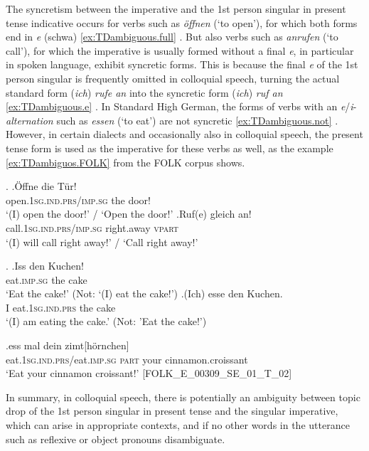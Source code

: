 The syncretism between the imperative  and the 1st person singular in present tense indicative occurs for verbs such as \textit{öffnen} (`to open'), for which both forms end in \textit{e} (schwa) \ref{ex:TDambiguous.full} \citep{imperativ}.
But also verbs such as \textit{anrufen} (`to call'), for which the imperative  is usually formed without a final \textit{e}, in particular in spoken language, exhibit syncretic forms.
This is because the final \textit{e} of the 1st person singular is frequently omitted in colloquial speech, turning the actual standard form (\textit{ich}) \textit{rufe an} into the syncretic form (\textit{ich}) \textit{ruf an} \ref{ex:TDambiguous.e} \citep{imperativ}.
In Standard High German, the forms of verbs with an \textit{e}/\textit{i}-\textit{alternation} such as \textit{essen} (`to eat') are not syncretic \ref{ex:TDambiguous.not} \citep{imperativ}.
However, in certain dialects and occasionally also in colloquial speech, the present tense form is used as the imperative  for these verbs as well, as the example \ref{ex:TDambiguos.FOLK} from the FOLK corpus   \citep{schmidt2014} shows.

\ex.\label{ex:TDambiguous}
\ag.\label{ex:TDambiguous.full}Öffne die Tür!\\
open.\textsc{1sg.ind.prs}/\textsc{imp.sg} the door!\\
`(I) open the door!' / `Open the door!'
\bg.\label{ex:TDambiguous.e}Ruf(e) gleich an!\\
call.\textsc{1sg.ind.prs}/\textsc{imp.sg} right.away \textsc{vpart}\\
`(I) will call right away!' / `Call right away!'

\ex.\label{ex:TDambiguous.not}
\ag.Iss den Kuchen!\\
eat.\textsc{imp.sg} the cake\\
`Eat the cake!' (Not: `(I) eat the cake!')
\bg.(Ich) esse den Kuchen.\\
I eat.\textsc{1sg.ind.prs} the cake\\
`(I) am eating the cake.' (Not: 'Eat the cake!')

\exg.\label{ex:TDambiguos.FOLK}ess mal dein zimt[hörnchen]\\
eat.\textsc{1sg.ind.prs}/eat.\textsc{imp.sg} \textsc{part} your cinnamon.croissant\\
`Eat your cinnamon croissant!' [FOLK\_E\_00309\_SE\_01\_T\_02]

In summary, in colloquial speech, there is potentially an ambiguity  between topic drop of the 1st person singular in present tense and the singular imperative,  which can arise in appropriate contexts, and if no other words in the utterance such as reflexive or object pronouns disambiguate.

